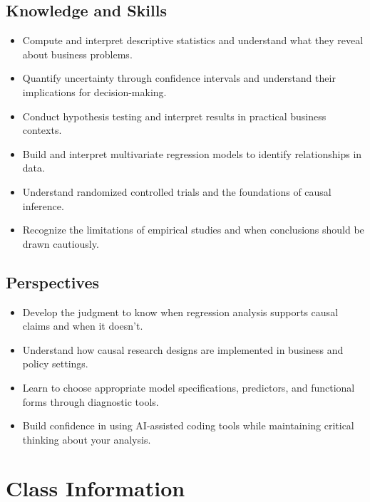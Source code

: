 \documentclass[11pt,letterpaper]{article}
\begin{document}
\subsection*{Knowledge and Skills}
\begin{itemize}
    \item Compute and interpret descriptive statistics and understand what they reveal about business problems.
    \item Quantify uncertainty through confidence intervals and understand their implications for decision-making.
    \item Conduct hypothesis testing and interpret results in practical business contexts.
    \item Build and interpret multivariate regression models to identify relationships in data.
    \item Understand randomized controlled trials and the foundations of causal inference.
    \item Recognize the limitations of empirical studies and when conclusions should be drawn cautiously.
\end{itemize}

\subsection*{Perspectives}
\begin{itemize}
    \item Develop the judgment to know when regression analysis supports causal claims and when it doesn't.
    \item Understand how causal research designs are implemented in business and policy settings.
    \item Learn to choose appropriate model specifications, predictors, and functional forms through diagnostic tools.
    \item Build confidence in using AI-assisted coding tools while maintaining critical thinking about your analysis.
\end{itemize}

\section*{Class Information}
\end{document}
